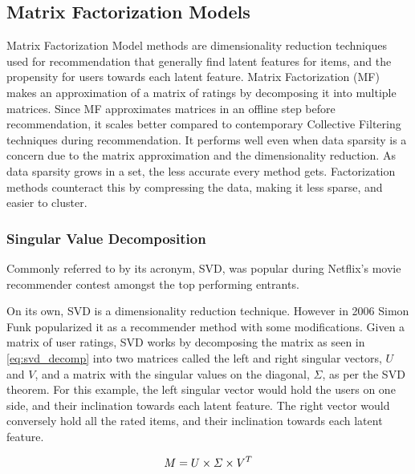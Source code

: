 \subsection{Matrix Factorization Models} \label{bg:sub:factorizationmodels}
Matrix Factorization Model methods are dimensionality reduction techniques used for recommendation that generally find latent features for items, and the propensity for users towards each latent feature.
Matrix Factorization (MF) makes an approximation of a matrix of ratings by decomposing it into multiple matrices. Since MF approximates matrices in an offline step before recommendation, it scales better compared to contemporary Collective Filtering techniques during recommendation. It performs well even when data sparsity is a concern due to the matrix approximation and the dimensionality reduction.
As data sparsity grows in a set, the less accurate every method gets. Factorization methods counteract this by compressing the data, making it less sparse, and easier to cluster.

\subsubsection{Singular Value Decomposition}
Commonly referred to by its acronym, SVD, was popular during Netflix's movie recommender contest amongst the top performing entrants.

On its own, SVD is a dimensionality reduction technique. However in 2006 Simon Funk \cite{svdsimonfunk} popularized it as a recommender method with some modifications.
Given a matrix of user ratings, SVD works by decomposing the matrix as seen in \ref{eq:svd_decomp} into two matrices called the left and right singular vectors, $U$ and $V$, and a matrix with the singular values on the diagonal, $\Sigma$, as per the SVD theorem. For this example, the left singular vector would hold the users on one side, and their inclination towards each latent feature. The right vector would conversely hold all the rated items, and their inclination towards each latent feature.

\begin{equation} \label{eq:svd_decomp}
\centering
M = U\times \Sigma \times V^T
\end{equation}


